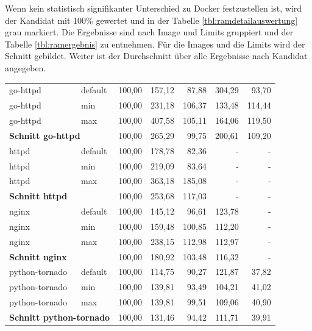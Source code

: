 Wenn kein statistisch signifikanter Unterschied zu Docker festzustellen ist, wird der Kandidat mit 100\% gewertet und in der Tabelle \ref{tbl:ramdetailauswertung} grau markiert.
Die Ergebnisse sind nach Image und Limits gruppiert und der Tabelle \ref{tbl:ramergebnis} zu entnehmen. Für die Images und die Limits wird der Schnitt gebildet. Weiter ist der Durchschnitt über alle Ergebnisse nach Kandidat angegeben. 

\begin{table}[h]
	\myfloatalign
	\small 
	\begin{tabularx}{\textwidth}{Xlrrrrr} \hline
		\spacedlowsmallcaps{Image} & \spacedlowsmallcaps{Limit} & \spacedlowsmallcaps{Docker} & \spacedlowsmallcaps{Kata} & \spacedlowsmallcaps{Kata FC} & \spacedlowsmallcaps{gVisor} & \spacedlowsmallcaps{Nabla} \\ \hline
		go-httpd & default & 100,00 & 157,12 & 87,88 & 304,29 & 93,70 \\
		go-httpd & min & 100,00 & 231,18 & 106,37 & 133,48 & 114,44 \\
		go-httpd & max & 100,00 & 407,58 & 105,11 & 164,06 & 119,50 \\ \hline
		\multicolumn{2}{l}{\textbf{Schnitt go-httpd}} & 100,00 & 265,29 & 99,75 & 200,61 & 109,20 \\ \hline
		httpd & default & 100,00 & 178,78 & 82,36 & - & - \\
		httpd & min & 100,00 & 219,09 & 83,64 & - & - \\
		httpd & max & 100,00 & 363,18 & 185,08 & - & - \\ \hline
		\multicolumn{2}{l}{\textbf{Schnitt httpd}} & 100,00 & 253,68 & 117,03 & - & - \\ \hline
		nginx & default & 100,00 & 145,12 & 96,61 & 123,78 & - \\
		nginx & min & 100,00 & 159,48 & 100,85 & 112,20 & - \\
		nginx & max & 100,00 & 238,15 & 112,98 & 112,97 & - \\ \hline
		\multicolumn{2}{l}{\textbf{Schnitt nginx}} & 100,00 & 180,92 & 103,48 & 116,32 & - \\ \hline
		python-tornado & default & 100,00 & 114,75 & 90,27 & 121,87 & 37,82 \\
		python-tornado & min & 100,00 & 139,81 & 93,49 & 104,21 & 41,02 \\
		python-tornado & max & 100,00 & 139,81 & 99,51 & 109,06 & 40,90\\ \hline
		\multicolumn{2}{l}{\textbf{Schnitt python-tornado}} & 100,00 & 131,46 & 94,42 & 111,71 & 39,91 \\ \hline

\end{tabularx}
\end{table}
